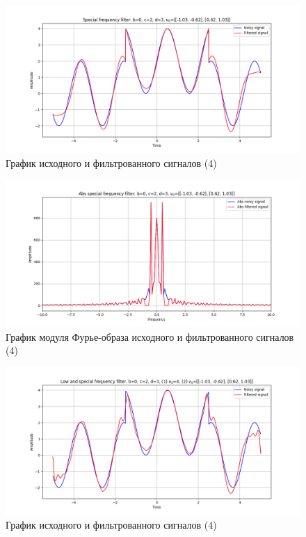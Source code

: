 \documentclass[a4paper, 12pt]{article}
\begin{document}
    \begin{figure}[!htb]
        \centering
        \includegraphics[scale=0.48]{4_u_flt_u_nospec.png}
        \captionsetup{skip=0pt}
        \caption{График исходного и фильтрованного сигналов (4)}
        \label{fig:fig101}
    \end{figure}
    \begin{figure}[!htb]
        \centering
        \includegraphics[scale=0.48]{4_abs_u_U_nospec.png}
        \captionsetup{skip=0pt}
        \caption{График модуля Фурье-образа исходного и фильтрованного сигналов (4)}
        \label{fig:fig102}
    \end{figure}
    \begin{figure}[!htb]
        \centering
        \includegraphics[scale=0.48]{4_3_u_flt_u_nospec.png}
        \captionsetup{skip=0pt}
        \caption{График исходного и фильтрованного сигналов (4)}
        \label{fig:fig107}
    \end{figure}
\end{document}
